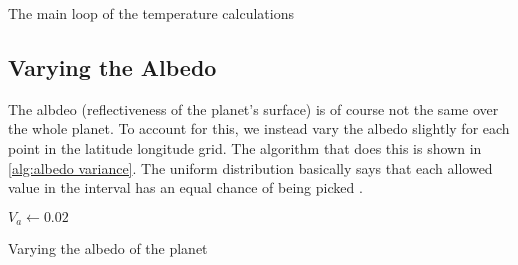\begin{algorithm}[hbt]
    \SetAlgoLined
    \caption{The main loop of the temperature calculations}
    \label{alg:temperature with density}
\end{algorithm}

\subsection{Varying the Albedo}
The albdeo (reflectiveness of the planet's surface) is of course not the same over the whole planet. To account for this, we instead vary the albedo slightly for each point in the latitude 
longitude grid. The algorithm that does this is shown in \autoref{alg:albedo variance}. The uniform distribution basically says that each allowed value in the interval has an equal chance of 
being picked \cite{uniformdist}.

\begin{algorithm}
    $V_a \leftarrow 0.02$ \;
    \caption{Varying the albedo of the planet}
    \label{alg:albedo variance}
\end{algorithm}

